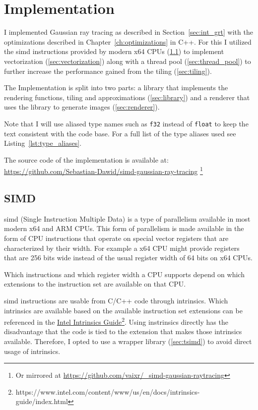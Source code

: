 \documentclass[a4paper, 11pt]{memoir}
\begin{document}
    \chapter{Implementation}
    \label{ch:implementation}
    I implemented Gaussian ray tracing as described in Section~\ref{sec:int_grt} with the optimizations described in Chapter~\ref{ch:optimizations} in C++. For this I utilized the \gls{simd}
    instructions provided by modern x64 CPUs (\ref{sec:simd}) to implement vectorization (\ref{sec:vectorization}) along with a thread pool (\ref{sec:thread_pool}) to further increase
    the performance gained from the tiling (\ref{sec:tiling}).

    The Implementation is split into two parts: a library that implements the rendering functions, tiling and approximations (\ref{sec:library}) and a renderer that uses the library to generate images (\ref{sec:renderer}).

    Note that I will use aliased type names such as \texttt{f32} instead of \texttt{float} to keep the text consistent with the code base.
    For a full list of the type aliases used see Listing~\ref{lst:type_aliases}.

    The source code of the implementation is available at: \\\href{https://github.com/Sebastian-Dawid/simd-gaussian-ray-tracing}{https://github.com/Sebastian-Dawid/simd-gaussian-ray-tracing}
    \footnote{Or mirrored at \href{https://github.com/vaixr/_simd-gaussian-raytracing}{https://github.com/vaixr/\_simd-gaussian-raytracing}}

    \section{SIMD}
    \label{sec:simd}
    \gls{simd} (Single Instruction Multiple Data) is a type of parallelism available in most modern x64 and ARM CPUs. This form of parallelism is made available in the form of CPU instructions
    that operate on special vector registers that are characterized by their width. For example a x64 CPU might provide registers that are 256 bits wide instead of the usual
    register width of 64 bits on x64 CPUs.
    
    Which instructions and which register width a CPU supports depend on which extensions to the instruction set are available on that CPU.

    \gls{simd} instructions are usable from C/C++ code through intrinsics. Which intrinsics are available based on the available instruction set extensions
    can be referenced in the \href{https://www.intel.com/content/www/us/en/docs/intrinsics-guide/index.html}{Intel Intrinsics Guide}\footnote{https://www.intel.com/content/www/us/en/docs/intrinsics-guide/index.html}.
    Using instrinsics directly has the disadvantage that the code is tied to the extension that makes those intrinsics available. Therefore, I opted to use a wrapper library (\ref{sec:tsimd})
    to avoid direct usage of intrinsics.
\end{document}
